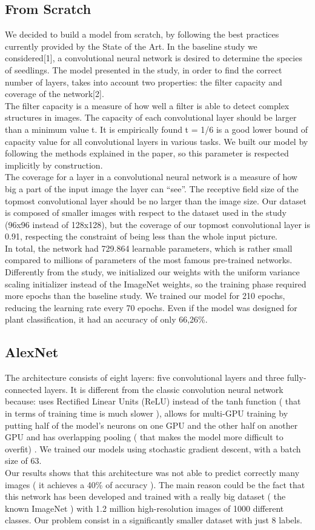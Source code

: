 \documentclass[11pt, oneside]{article}
\begin{document}
\subsection{From Scratch}
We decided to build a model from scratch, by following the best practices currently provided by the State of the Art. In the baseline study we considered[1],  a convolutional neural network is desired to determine the species of seedlings. 
The model presented in the study, in order to find the correct number of layers, takes into account two properties: the filter capacity and coverage of the network[2]. \\
The filter capacity is a measure of how well a filter is able to detect complex structures in images. The capacity of each convolutional layer should be larger than a minimum value t. It is empirically found t = 1/6 is a good lower bound of capacity value for all convolutional layers in various tasks.
We built our model by following the methods explained in the paper, so this parameter is respected implicitly by construction. \\
The coverage for a layer in a convolutional neural network is a measure of how big a part of the input image the layer can “see”. 
The receptive field size of the topmost convolutional layer should be no larger than the image size. Our dataset is composed of smaller images with respect to the dataset used in the study (96x96 instead of 128x128), but the coverage of our topmost convolutional layer is 0.91, respecting the constraint of being less than the whole input picture. \\
In total, the network had 729.864 learnable parameters, which is rather small compared to millions of parameters of the most famous pre-trained networks. Differently from the study, we initialized our weights with the uniform variance scaling initializer instead of the ImageNet weights, so the training phase required more epochs than the baseline study. We trained our model for 210 epochs, reducing the learning rate every 70 epochs. Even if the model was designed for plant classification, it had an accuracy of only 66,26\%.
\subsection{AlexNet}
The architecture consists of eight layers: five convolutional layers and three fully-connected layers. It is different from the classic convolution neural network because: uses Rectified Linear Units (ReLU) instead of the tanh function ( that in terms of training time is much slower ), allows for multi-GPU training by putting half of the model’s neurons on one GPU and the other half on another GPU and has overlapping pooling ( that makes the model more difficult to overfit) .
We trained our models using stochastic gradient descent, with a batch size of 63.\\
Our results shows that this architecture was not able to predict correctly many images ( it achieves a 40\% of accuracy ). The main reason could be the fact that this network has been developed and trained with a really big dataset ( the known ImageNet ) with  1.2 million high-resolution images of 1000 different classes. Our problem consist in a significantly smaller dataset with just 8 labels.
\end{document}
